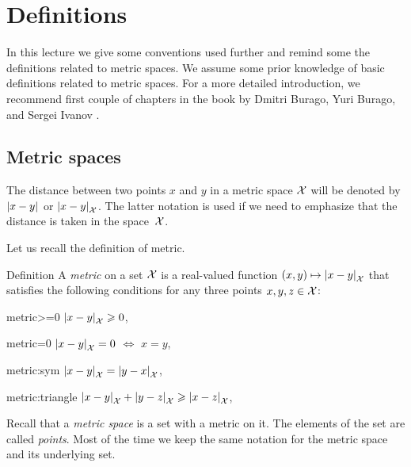 \chapter{Definitions}

In this lecture we give some conventions used further
and remind some the definitions related to metric spaces.
We assume some prior knowledge of basic definitions related to metric spaces.
For a more detailed introduction, we recommend first couple of chapters in the book by Dmitri Burago, Yuri Burago, and Sergei Ivanov \cite{burago-burago-ivanov}.

\section{Metric spaces}
\label{sec:metric spaces}

The distance between two points $x$ and $y$ in a metric space $\mathcal{X}$ will be denoted by $\dist{x}{y}{}$ or $\dist{x}{y}{\spc{X}}$.
The latter notation is used if we need to emphasize 
that the distance is taken in the space~${\mathcal{X}}$.

Let us recall the definition of metric. 

\begin{thm}{Definition}\label{def:metric}
A \emph{metric} on a set $\mathcal{X}$ is a real-valued function $(x,y)\mapsto\dist{x}{y}{\spc{X}}$ that satisfies the following conditions for any three points $x,y,z\in \mathcal{X}$:

\begin{subthm}{metric>=0}
$\dist{x}{y}{\spc{X}}\ge 0$,
\end{subthm}

\begin{subthm}{metric=0} $\dist{x}{y}{\spc{X}}= 0$ $\iff$ $x=y$,
\end{subthm}

\begin{subthm}{metric:sym} $\dist{x}{y}{\spc{X}}=\dist{y}{x}{\spc{X}}$,
\end{subthm}

\begin{subthm}{metric:triangle} $\dist{x}{y}{\spc{X}}+\dist{y}{z}{\spc{X}}\ge\dist{x}{z}{\spc{X}}$,
\end{subthm}

\end{thm}

Recall that a \emph{metric space} is a set with a metric on it.
The elements of the set are called \emph{points}. 
Most of the time we keep the same notation for the metric space and its underlying set.

